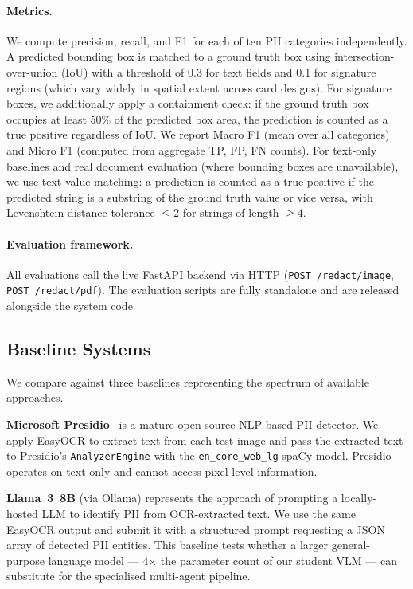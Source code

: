\documentclass[conference]{IEEEtran}
\begin{document}
\paragraph{Metrics.}
We compute precision, recall, and F1 for each of
ten PII categories independently.
A predicted bounding box is matched to a ground truth
box using intersection-over-union (IoU) with a
threshold of 0.3 for text fields and 0.1 for
signature regions (which vary widely in spatial
extent across card designs).
For signature boxes, we additionally apply a
containment check: if the ground truth box occupies
at least 50\% of the predicted box area, the
prediction is counted as a true positive regardless
of IoU.
We report Macro F1 (mean over all categories) and
Micro F1 (computed from aggregate TP, FP, FN counts).
For text-only baselines and real document evaluation
(where bounding boxes are unavailable), we use
text value matching: a prediction is counted as a
true positive if the predicted string is a substring
of the ground truth value or vice versa, with
Levenshtein distance tolerance $\leq 2$ for strings
of length $\geq 4$.

\paragraph{Evaluation framework.}
All evaluations call the live FastAPI backend via
HTTP (\texttt{POST /redact/image},
\texttt{POST /redact/pdf}).
The evaluation scripts are fully standalone and
are released alongside the system code.

\subsection{Baseline Systems}

We compare against three baselines representing
the spectrum of available approaches.

\textbf{Microsoft Presidio}~\cite{presidio2020}
is a mature open-source NLP-based PII detector.
We apply EasyOCR to extract text from each test
image and pass the extracted text to Presidio's
\texttt{AnalyzerEngine} with the
\texttt{en\_core\_web\_lg} spaCy model.
Presidio operates on text only and cannot access
pixel-level information.

\textbf{Llama~3~8B} (via Ollama) represents the
approach of prompting a locally-hosted LLM to
identify PII from OCR-extracted text.
We use the same EasyOCR output and submit it with
a structured prompt requesting a JSON array of
detected PII entities.
This baseline tests whether a larger general-purpose
language model --- 4$\times$ the parameter count of
our student VLM --- can substitute for the
specialised multi-agent pipeline.
\end{document}
